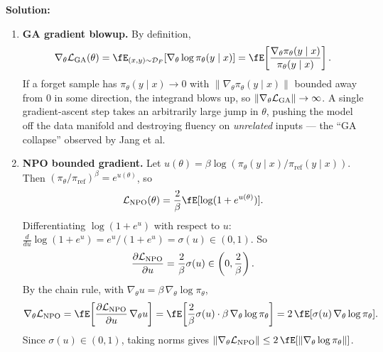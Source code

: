 \documentclass[12pt]{article}
\begin{document}
\begin{enumerate}
\begin{solution}
{\bf Solution:}\\
\begin{enumerate}
    \item \textbf{GA gradient blowup.} By definition,
    \begin{align*}
        \nabla_\theta \cL_{\mathrm{GA}}(\theta) = \fE_{(x,y) \sim \cD_F}[\nabla_\theta \log\pi_\theta(y \mid x)] = \fE\!\left[\frac{\nabla_\theta \pi_\theta(y \mid x)}{\pi_\theta(y \mid x)}\right].
    \end{align*}
    If a forget sample has $\pi_\theta(y \mid x) \to 0$ with $\|\nabla_\theta \pi_\theta(y \mid x)\|$ bounded away from $0$ in some direction, the integrand blows up, so $\|\nabla_\theta {\mathcal{L}}_{\mathrm{GA}}\| \to \infty$. A single gradient-ascent step takes an arbitrarily large jump in $\theta$, pushing the model off the data manifold and destroying fluency on \emph{unrelated} inputs --- the ``GA collapse'' observed by Jang et al.

    \item \textbf{NPO bounded gradient.} Let $u(\theta) = \beta\log(\pi_\theta(y \mid x)/\pi_{\mathrm{ref}}(y \mid x))$. Then $(\pi_\theta/\pi_{\mathrm{ref}})^\beta = e^{u(\theta)}$, so
    \begin{align*}
        \cL_{\mathrm{NPO}}(\theta) = \frac{2}{\beta}\fE[\log(1 + e^{u(\theta)})].
    \end{align*}
    Differentiating $\log(1 + e^u)$ with respect to $u$: $\frac{d}{du}\log(1 + e^u) = e^u/(1 + e^u) = \sigma(u) \in (0, 1)$. So
    \begin{align*}
        \frac{\partial {\mathcal{L}}_{\mathrm{NPO}}}{\partial u} = \frac{2}{\beta} \sigma(u) \in \left(0, \frac{2}{\beta}\right).
    \end{align*}
    By the chain rule, with $\nabla_\theta u = \beta\,\nabla_\theta \log\pi_\theta$,
    \begin{align*}
        \nabla_\theta \cL_{\mathrm{NPO}} = \fE\!\left[\frac{\partial \cL_{\mathrm{NPO}}}{\partial u}\,\nabla_\theta u\right] = \fE\!\left[\frac{2}{\beta}\sigma(u)\cdot \beta\, \nabla_\theta \log\pi_\theta\right] = 2\,\fE[\sigma(u)\,\nabla_\theta \log\pi_\theta].
    \end{align*}
    Since $\sigma(u) \in (0, 1)$, taking norms gives $\|\nabla_\theta \cL_{\mathrm{NPO}}\| \le 2\,\fE[\|\nabla_\theta \log\pi_\theta\|]$.


\end{enumerate}
\end{solution}
\end{enumerate}
\end{document}
